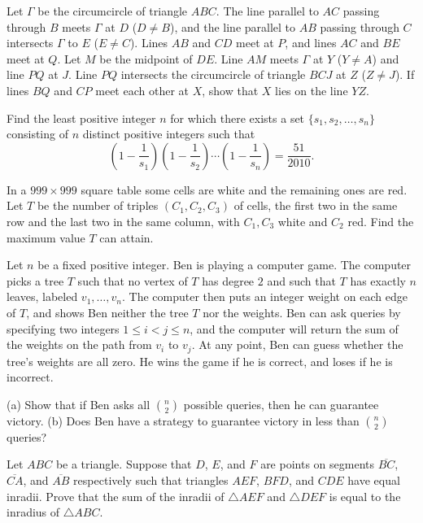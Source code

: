 \documentclass[11pt]{scrartcl}
\begin{document}
\begin{problem}[541615131309445]
	Let $\Gamma$ be the circumcircle of triangle $ABC$. The line parallel to $AC$ passing through $B$ meets $\Gamma$ at $D$ ($D\neq B$), and the line parallel to $AB$ passing through $C$ intersects $\Gamma$ to $E$ ($E\neq C$). Lines $AB$ and $CD$ meet at $P$, and lines $AC$ and $BE$ meet at $Q$. Let $M$ be the midpoint of $DE$. Line $AM$ meets $\Gamma$ at $Y$ ($Y\neq A$) and line $PQ$ at $J$. Line $PQ$ intersects the circumcircle of triangle $BCJ$ at $Z$ ($Z\neq J$). If lines $BQ$ and $CP$ meet each other at $X$, show that $X$ lies on the line $YZ$.
\end{problem}
\begin{problem}[2008341270346760748]
Find the least positive integer $n$ for which there exists a set $\{s_1, s_2, \ldots , s_n\}$ consisting of $n$ distinct positive integers such that
\[ \left( 1 - \frac{1}{s_1} \right) \left( 1 - \frac{1}{s_2} \right) \cdots \left( 1 - \frac{1}{s_n} \right) = \frac{51}{2010}.\]
\end{problem}
\begin{problem}[168901060554419884]
In a $999 \times 999$ square table some cells are white and the remaining ones are red. Let $T$ be the number of triples $(C_1,C_2,C_3)$ of cells, the first two in the same row and the last two in the same column, with $C_1,C_3$ white and $C_2$ red. Find the maximum value $T$ can attain.
\end{problem}
\begin{problem}[846826818545123]
	Let $n$ be a fixed positive integer. Ben is playing a computer game. The computer picks a tree $T$ such that no vertex of $T$ has degree $2$ and such that $T$ has exactly $n$ leaves, labeled $v_1,\ldots, v_n$. The computer then puts an integer weight on each edge of $T$, and shows Ben neither the tree $T$ nor the weights. Ben can ask queries by specifying two integers $1\leq i < j \leq n$, and the computer will return the sum of the weights on the path from $v_i$ to $v_j$. At any point, Ben can guess whether the tree's weights are all zero. He wins the game if he is correct, and loses if he is incorrect.

(a) Show that if Ben asks all $\binom n2$ possible queries, then he can guarantee victory.
(b) Does Ben have a strategy to guarantee victory in less than $\binom n2$ queries?
\end{problem}
\begin{problem}[8778540732652162753]
Let $ABC$ be a triangle. Suppose that $D$, $E$, and $F$ are points on segments $\overline{BC}$, $\overline{CA}$, and $\overline{AB}$ respectively such that triangles $AEF$, $BFD$, and $CDE$ have equal inradii. Prove that the sum of the inradii of $\triangle AEF$ and $\triangle DEF$ is equal to the inradius of $\triangle ABC$.
\end{problem}
\end{document}
